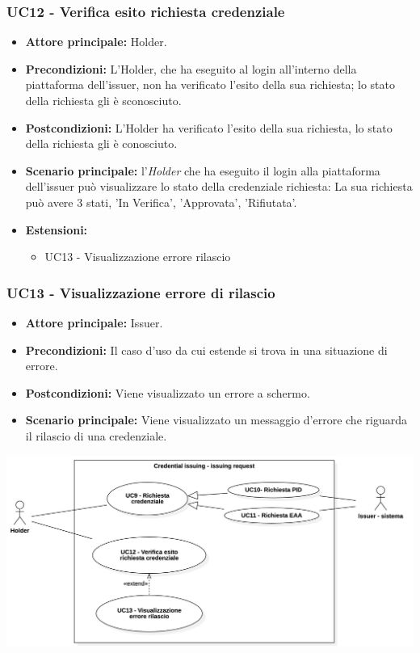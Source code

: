 \subsubsection{UC12 - Verifica esito richiesta credenziale} 
\begin{itemize}
    \item \textbf{Attore principale:} Holder.
    \item \textbf{Precondizioni:} L'Holder, che ha eseguito al login all'interno della piattaforma dell'issuer, non ha verificato l'esito della sua richiesta; lo stato della richiesta gli è sconosciuto.
    \item \textbf{Postcondizioni:} L'Holder ha verificato l'esito della sua richiesta, lo stato della richiesta gli è conosciuto.
    \item \textbf{Scenario principale:} l'\textit{Holder} che ha eseguito il login alla piattaforma dell'issuer può visualizzare lo stato della credenziale richiesta: 
    La sua richiesta può avere 3 stati, 'In Verifica', 'Approvata', 'Rifiutata'.\\
    \item \textbf{Estensioni:}
    \begin{itemize}
    \item  UC13 - Visualizzazione errore rilascio
    \end{itemize}
\end{itemize}

\subsubsection{UC13 - Visualizzazione errore di rilascio}
\begin{itemize}
    \item \textbf{Attore principale:} Issuer.
    \item \textbf{Precondizioni:} Il caso d'uso da cui estende si trova in una situazione di errore.
    \item \textbf{Postcondizioni:} Viene visualizzato un errore a schermo. 
    \item \textbf{Scenario principale:} Viene visualizzato un messaggio d’errore che riguarda il rilascio di una credenziale.
\end{itemize}

\begin{center}
    \includegraphics[scale = 0.25]{./res/img/2Credential_issuing_2.png}
  \end{center}

